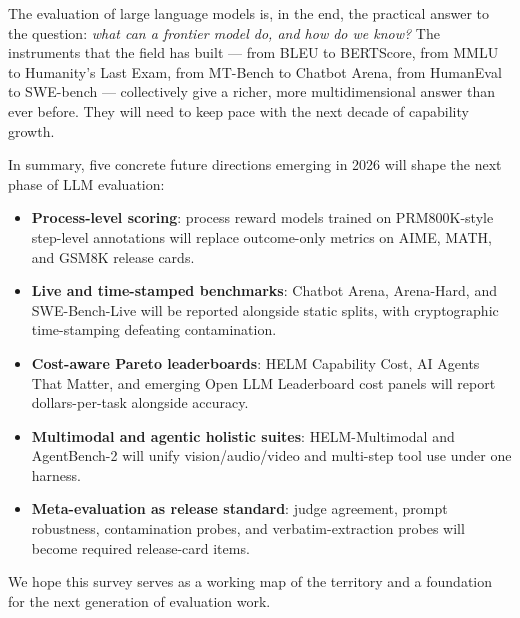 \documentclass{article}
\begin{document}
The evaluation of large language models is, in the end, the practical answer to the question: \emph{what can a frontier model do, and how do we know?} The instruments that the field has built --- from BLEU to BERTScore, from MMLU to Humanity's Last Exam, from MT-Bench to Chatbot Arena, from HumanEval to SWE-bench --- collectively give a richer, more multidimensional answer than ever before. They will need to keep pace with the next decade of capability growth.

In summary, five concrete future directions emerging in 2026 will shape the next phase of LLM evaluation:

\begin{itemize}

\item
  \textbf{Process-level scoring}: process reward models trained on PRM800K-style step-level annotations will replace outcome-only metrics on AIME, MATH, and GSM8K release cards.
\item
  \textbf{Live and time-stamped benchmarks}: Chatbot Arena, Arena-Hard, and SWE-Bench-Live will be reported alongside static splits, with cryptographic time-stamping defeating contamination.
\item
  \textbf{Cost-aware Pareto leaderboards}: HELM Capability Cost, AI Agents That Matter, and emerging Open LLM Leaderboard cost panels will report dollars-per-task alongside accuracy.
\item
  \textbf{Multimodal and agentic holistic suites}: HELM-Multimodal and AgentBench-2 will unify vision/audio/video and multi-step tool use under one harness.
\item
  \textbf{Meta-evaluation as release standard}: judge agreement, prompt robustness, contamination probes, and verbatim-extraction probes will become required release-card items.
\end{itemize}

We hope this survey serves as a working map of the territory and a foundation for the next generation of evaluation work.



\end{document}
